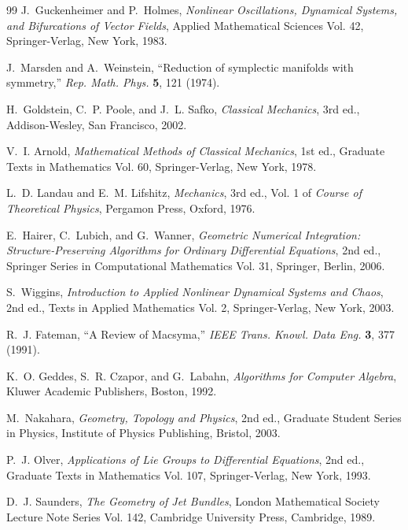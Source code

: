 \documentclass[11pt,a4paper]{article}
\begin{document}
\begin{thebibliography}{99}
	J.~Guckenheimer and P.~Holmes, \textit{Nonlinear Oscillations, Dynamical Systems, and Bifurcations of Vector Fields}, Applied Mathematical Sciences Vol. 42, Springer-Verlag, New York, 1983.
	
	J.~Marsden and A.~Weinstein, ``Reduction of symplectic manifolds with symmetry,'' \textit{Rep. Math. Phys.} \textbf{5}, 121 (1974).
	
	H.~Goldstein, C.~P. Poole, and J.~L. Safko, \textit{Classical Mechanics}, 3rd ed., Addison-Wesley, San Francisco, 2002.
	
	V.~I. Arnold, \textit{Mathematical Methods of Classical Mechanics}, 1st ed., Graduate Texts in Mathematics Vol. 60, Springer-Verlag, New York, 1978.
	
	L.~D. Landau and E.~M. Lifshitz, \textit{Mechanics}, 3rd ed., Vol. 1 of \textit{Course of Theoretical Physics}, Pergamon Press, Oxford, 1976.
	
	E.~Hairer, C.~Lubich, and G.~Wanner, \textit{Geometric Numerical Integration: Structure-Preserving Algorithms for Ordinary Differential Equations}, 2nd ed., Springer Series in Computational Mathematics Vol. 31, Springer, Berlin, 2006.
	
	S.~Wiggins, \textit{Introduction to Applied Nonlinear Dynamical Systems and Chaos}, 2nd ed., Texts in Applied Mathematics Vol. 2, Springer-Verlag, New York, 2003.
	
	R.~J. Fateman, ``A Review of Macsyma,'' \textit{IEEE Trans. Knowl. Data Eng.} \textbf{3}, 377 (1991).
	
	K.~O. Geddes, S.~R. Czapor, and G.~Labahn, \textit{Algorithms for Computer Algebra}, Kluwer Academic Publishers, Boston, 1992.
	
	M.~Nakahara, \textit{Geometry, Topology and Physics}, 2nd ed., Graduate Student Series in Physics, Institute of Physics Publishing, Bristol, 2003.
	
	P.~J. Olver, \textit{Applications of Lie Groups to Differential Equations}, 2nd ed., Graduate Texts in Mathematics Vol. 107, Springer-Verlag, New York, 1993.
	
	D.~J. Saunders, \textit{The Geometry of Jet Bundles}, London Mathematical Society Lecture Note Series Vol. 142, Cambridge University Press, Cambridge, 1989.
	

\end{thebibliography}
\end{document}
